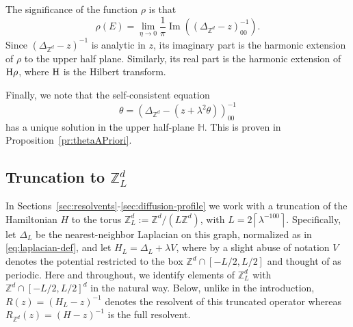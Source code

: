 \documentclass[11pt]{amsart}
\def\bbH{{\mathbb H}}
\def\bbZ{{\mathbb Z}}
\def\Z{{\mathbb{Z}}}
\newcommand{\Impt}{\operatorname*{Im}}
\numberwithin{equation}{section}
\numberwithin{theorem}{section}
\begin{document}
The significance of the function $\rho$ is that
\[
\rho(E) = \lim_{\eta\to 0} \frac{1}{\pi} \Impt ((\Delta_{\bbZ^d}-z)^{-1}_{00}).
\]
Since $(\Delta_{\bbZ^d}-z)^{-1}$ is analytic in $z$, its imaginary part is the harmonic extension of $\rho$ to the upper half plane.
 Similarly, its real part is the harmonic extension of $\rm{H}\rho$, where $\rm{H}$ is the Hilbert transform.

Finally, we note that the self-consistent
equation
\[
\theta = (\Delta_{\bbZ^d}-(z+\lambda^2\theta))^{-1}_{00}
\]
has a unique solution in the upper half-plane $\bbH$.  This is proven in Proposition~\ref{pr:thetaAPriori}.

\subsection{Truncation to $\Z^d_L$}
In Sections~\ref{sec:resolvents}-\ref{sec:diffusion-profile} we work with a truncation of the Hamiltonian $H$ to the torus $\Z^d_L:=\Z^d/(L\Z^d)$, with $L=2\left\lceil \lambda^{-100}\right\rceil$.
Specifically, let $\Delta_L$ be the nearest-neighbor Laplacian on this graph, normalized as in \ref{eq:laplacian-def}, and let $H_L=\Delta_L+\lambda V$, where by a slight abuse of notation $V$ denotes the potential restricted to the box $\Z^d\cap[-L/2,L/2]$ and thought of as periodic. Here and throughout, we identify elements of $\Z^d_L$ with $\Z^d\cap [-L/2,L/2]^d$ in the natural way.
Below, unlike in the introduction, $R(z)=(H_L-z)^{-1}$ denotes the resolvent of this truncated operator whereas $R_{\Z^d}(z)=(H-z)^{-1}$ is the full resolvent.
\end{document}

